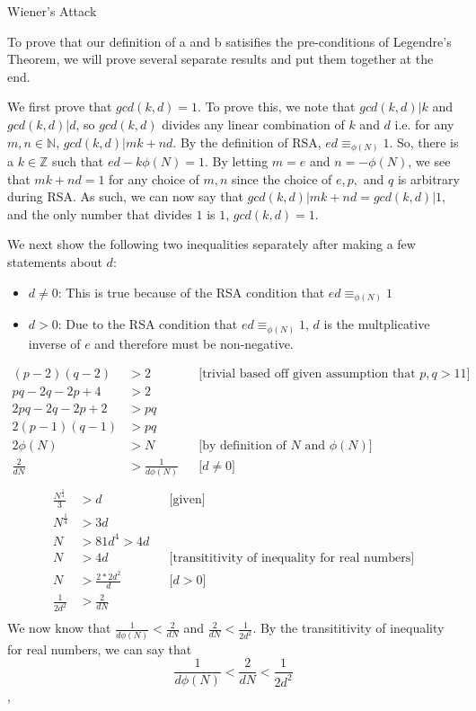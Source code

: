 \documentclass[11pt, nopagenumbers]{adamblan-hw}
\newcommand{\NN}{\mathbb{N}}
\newcommand{\ZZ}{\mathbb{Z}}
\begin{document}
\begin{question}{\color{red} Wiener's Attack}
\begin{part}
To prove that our definition of a and b satisifies the pre-conditions of Legendre's Theorem, we will prove several separate results and put them together at the end.

We first prove that $gcd(k, d) = 1$. To prove this, we note that $gcd(k, d) | k$ and $gcd(k, d) | d$, so $gcd(k, d)$ divides any linear combination of $k$ and $d$ i.e.
for any $m, n \in \NN$, $gcd(k, d) | mk + nd$. By the definition of RSA, $ed \equiv_{\phi(N)} 1$.
So, there is a $k \in \ZZ$ such that $ed - k\phi(N) = 1$. By letting $m = e$ and $n = -\phi(N)$, we see that $mk + nd = 1$ for any choice of $m, n$ since the choice of $e, p,$ and $q$ 
is arbitrary during RSA. As such, we can now say that $gcd(k, d)|mk + nd = gcd(k, d) | 1$, and the only number that divides $1$ is $1$, $gcd(k, d) = 1$.


We next show the following two inequalities separately after making a few statements about $d$:
\begin{itemize}
    \item $d \neq 0$: This is true because of the RSA condition that $ed \equiv_{\phi(N)} 1$
    \item $d > 0$: Due to the RSA condition that  $ed \equiv_{\phi(N)} 1$, $d$ is the multplicative inverse of $e$ and therefore must be non-negative.
\end{itemize}
\begin{align*}
(p-2)(q-2) &> 2 && \text{[trivial based off given assumption that $p, q > 11$]} \\
pq - 2q - 2p + 4 &> 2 \\
2pq - 2q - 2p + 2 &> pq \\
2(p - 1)(q-1) &> pq \\
2\phi(N) &> N && \text{[by definition of $N$ and $\phi(N)$]} \\
\frac{2}{dN} &> \frac{1}{d\phi(N)} && \text{[$d \neq 0$]}\\
\end{align*}
\vspace{-1.5cm}
\begin{align*}
\frac{N^{\frac{1}{4}}}{3} &> d&& \text{[given]} \\
N^{\frac{1}{4}} &> 3d \\
N &> 81d^4 > 4d\\
N &> 4d  && \text{[transititivity of inequality for real numbers]}\\
N &> \frac{2 * 2d^2}{d} && \text{[$d > 0$]}\\
\frac{1}{2d^2} &> \frac{2}{dN} \\
\end{align*}
We now know that $\frac{1}{d\phi(N)} < \frac{2}{dN}$ and $\frac{2}{dN} < \frac{1}{2d^2}$. By the transititivity 
of inequality for real numbers, we can say that $$\frac{1}{d\phi(N)} < \frac{2}{dN} < \frac{1}{2d^2}$$,
\end{part}


\end{question}
\end{document}
